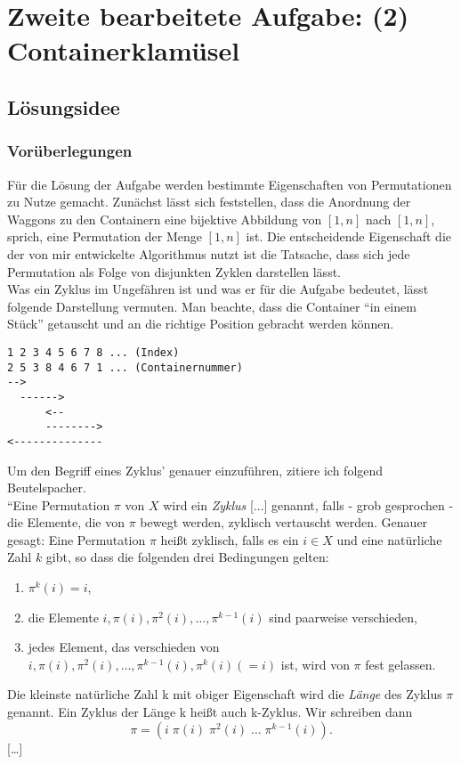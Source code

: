 \section{Zweite bearbeitete Aufgabe: (2) Containerklamüsel}
\subsection{Lösungsidee}
\subsubsection{Vorüberlegungen}
Für die Lösung der Aufgabe werden bestimmte Eigenschaften von Permutationen zu Nutze gemacht. Zunächst lässt sich feststellen, dass
die Anordnung der Waggons zu den Containern eine bijektive Abbildung von $[1,n]$ nach $[1,n]$, sprich, eine Permutation der Menge $[1,n]$ ist.
Die entscheidende Eigenschaft die der von mir entwickelte Algorithmus nutzt ist die Tatsache, dass
sich jede Permutation als Folge von disjunkten Zyklen darstellen lässt.\\
Was ein Zyklus im Ungefähren ist und was er für die Aufgabe bedeutet, lässt folgende Darstellung vermuten.
Man beachte, dass die Container ``in einem Stück'' getauscht und an die richtige Position gebracht werden können.
\lstset{basicstyle=\ttfamily\small}
\begin{lstlisting}
1 2 3 4 5 6 7 8 ... (Index)
2 5 3 8 4 6 7 1 ... (Containernummer)
-->
  ------>
      <--
      -------->
<--------------
\end{lstlisting}
\lstset{basicstyle=\ttfamily\normalsize}
Um den Begriff eines Zyklus' genauer einzuführen, zitiere ich folgend Beutelspacher. \\

``Eine Permutation $\pi$ von $X$ wird ein \emph{Zyklus} [...] genannt, falls - grob gesprochen - die Elemente, die von $\pi$ bewegt werden,
zyklisch vertauscht werden. Genauer gesagt: Eine Permutation $\pi$ heißt zyklisch,
falls es ein $ i \in X$ und eine natürliche Zahl $k$ gibt, so dass die folgenden drei Bedingungen gelten:
\begin{enumerate}
 \item $\pi^k(i) = i$,
 \item die Elemente $i,\pi(i),\pi^2(i),\dots,\pi^{k-1}(i)$ sind paarweise verschieden,
 \item jedes Element, das verschieden von $i,\pi(i),\pi^2(i),\dots,\pi^{k-1}(i), \pi^k(i) (=i)$ ist, wird von $\pi$ fest gelassen.
\end{enumerate}
Die kleinste natürliche Zahl k mit obiger Eigenschaft wird die \emph{Länge} des Zyklus $\pi$ genannt.
Ein Zyklus der Länge k heißt auch k-Zyklus. Wir schreiben dann \[\pi=(i\;\pi(i)\;\pi^2(i) \; \dots \;\pi^{k-1}(i)).\]
[\dots]
